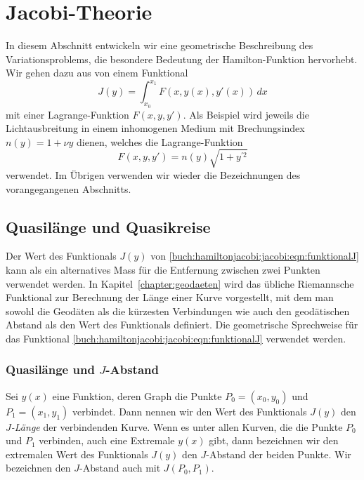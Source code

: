 %
%
%
\section{Jacobi-Theorie
\label{buch:hamiltonjacobi:section:jacobi}}

In diesem Abschnitt entwickeln wir eine geometrische Beschreibung des
Variationsproblems, die besondere Bedeutung der Hamilton-Funktion hervorhebt.
Wir gehen dazu aus von einem Funktional
\begin{equation}
J(y)
=
\int_{x_0}^{x_1}
F(x,y(x),y'(x))
\,dx
\label{buch:hamiltonjacobi:jacobi:eqn:funktionalJ}
\end{equation}
mit einer Lagrange-Funktion $F(x,y,y')$.
Als Beispiel wird jeweils die Lichtausbreitung in einem inhomogenen
Medium mit Brechungsindex $n(y) = 1+\nu y$ dienen, welches die
Lagrange-Funktion
\begin{equation}
F(x,y,y')
=
n(y) \sqrt{1+y^{\prime 2}}
\label{buch:hamiltonjacobi:jacobi:eqn:beispielF}
\end{equation}
verwendet.
Im Übrigen verwenden wir wieder die Bezeichnungen des vorangegangenen
Abschnitts.

%
%
\subsection{Quasilänge und Quasikreise
\label{buch:hamiltonjacobi:jacobi:subsection:quasi}}
Der Wert des Funktionals $J(y)$ von
\eqref{buch:hamiltonjacobi:jacobi:eqn:funktionalJ}
kann als ein alternatives Mass für die Entfernung zwischen
zwei Punkten verwendet werden.
In Kapitel~\ref{chapter:geodaeten} wird das übliche Riemannsche
Funktional zur Berechnung der Länge einer Kurve vorgestellt, mit dem
man sowohl die Geodäten als die kürzesten Verbindungen wie auch
den geodätischen Abstand als den Wert des Funktionals definiert.
Die geometrische Sprechweise für das Funktional 
\eqref{buch:hamiltonjacobi:jacobi:eqn:funktionalJ}
verwendet werden.

%
%
\subsubsection{Quasilänge und $J$-Abstand}
Sei $y(x)$ eine Funktion, deren Graph die Punkte $P_0=(x_0,y_0)$
und $P_1=(x_1,y_1)$ verbindet.
Dann nennen wir den Wert des Funktionals $J(y)$ den {\em $J$-Länge}
der verbindenden Kurve.
Wenn es unter allen Kurven, die die Punkte $P_0$  und $P_1$ verbinden,
auch eine Extremale $y(x)$ gibt, dann bezeichnen wir den extremalen
Wert des Funktionals $J(y)$ den $J$-Abstand der beiden Punkte.
Wir bezeichnen den $J$-Abstand auch mit $J(P_0,P_1)$.

